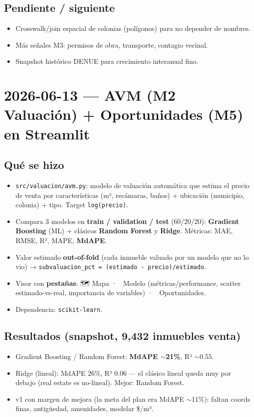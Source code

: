 \documentclass[11pt]{article}
\newcommand{\codigo}[1]{\texttt{#1}}
\newcommand{\pend}{\item[\textcolor{acento}{$\square$}]}
\begin{document}
\subsection*{Pendiente / siguiente}
\begin{itemize}
  \pend Crosswalk/join espacial de colonias (polígonos) para no depender de nombres.
  \pend Más señales M3: permisos de obra, transporte, contagio vecinal.
  \pend Snapshot histórico DENUE para crecimiento interanual fino.
\end{itemize}

\section*{2026-06-13 — AVM (M2 Valuación) + Oportunidades (M5) en Streamlit}

\subsection*{Qué se hizo}
\begin{itemize}
  \item \codigo{src/valuacion/avm.py}: modelo de valuación automática que estima el
        precio de venta por características (m², recámaras, baños) + ubicación
        (municipio, colonia) + tipo. Target \codigo{log(precio)}.
  \item Compara 3 modelos en \textbf{train / validation / test} (60/20/20):
        \textbf{Gradient Boosting} (ML) + clásicos \textbf{Random Forest} y
        \textbf{Ridge}. Métricas: MAE, RMSE, R², MAPE, \textbf{MdAPE}.
  \item Valor estimado \textbf{out-of-fold} (cada inmueble valuado por un modelo que
        no lo vio) → \codigo{subvaluacion\_pct = (estimado - precio)/estimado}.
  \item Visor con \textbf{pestañas}: 🗺️ Mapa · 🤖 Modelo (métricas/performance,
        scatter estimado-vs-real, importancia de variables) · 💎 Oportunidades.
  \item Dependencia: \codigo{scikit-learn}.
\end{itemize}

\subsection*{Resultados (snapshot, 9{,}432 inmuebles venta)}
\begin{itemize}
  \item Gradient Boosting / Random Forest: \textbf{MdAPE $\sim$21\%}, R² $\sim$0.55.
  \item Ridge (lineal): MdAPE 26\%, R² 0.06 — el clásico lineal queda muy por
        debajo (real estate es no-lineal). Mejor: Random Forest.
  \item v1 con margen de mejora (la meta del plan era MdAPE $\sim$11\%): faltan
        coords finas, antigüedad, amenidades, modelar \$/m².
\end{itemize}
\end{document}
